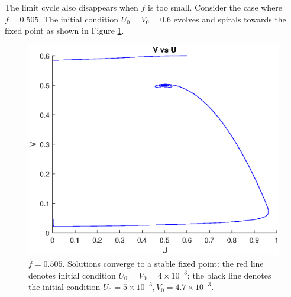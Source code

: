 \documentclass[twocolumn,amsmath,amssymb,aps]{revtex4}
\begin{document}
The limit cycle also disappears when $f$ is too small. Consider the case where $f = 0.505$. The initial condition $U_0 = V_0 = 0.6$ evolves and spirals towards the fixed point as shown in Figure \ref{fig:hopf2}.
\begin{figure}[!htb]
	\centering
	\includegraphics[scale=0.5]{hopf2.eps}
	\caption{$f = 0.505$. Solutions converge to a stable fixed point: the red line denotes initial condition $U_0 =V_0 = 4\times 10^{-3}$; the black line denotes the initial condition $U_0 = 5\times 10^{-3}, V_0 = 4.7 \times 10^{-3}$.}
	\label{fig:hopf2}
\end{figure}
\end{document}
